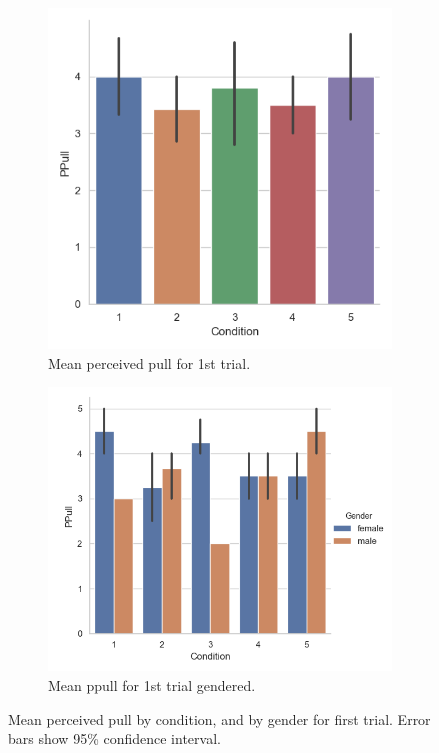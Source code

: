 \begin{figure}[H]
 \begin{subfigure}[b]{0.5\textwidth}
     \centering
     \includegraphics[scale=0.5]{Files/Plots/ppull_first_trial.png}
     \caption{Mean perceived pull for 1st trial.}
     \label{fig:meanPPull1st}
 \end{subfigure}
  \begin{subfigure}[b]{0.5\textwidth}
     \centering
     \includegraphics[scale=0.5]{Files/Plots/ppull_first_trial_gen.png}
     \caption{Mean ppull for 1st trial gendered.}
     \label{fig:meanPPullGen1st}
 \end{subfigure}
     \caption{Mean perceived pull by condition, and by gender for first trial. Error bars show 95\%  confidence interval.}
    \label{fig:PPull1st}
\end{figure}
